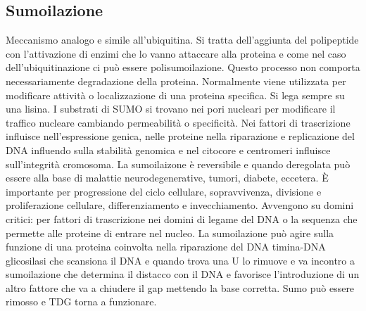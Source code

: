 \subsection{Sumoilazione}
Meccanismo analogo e simile all'ubiquitina. Si tratta dell'aggiunta del polipeptide con l'attivazione di enzimi che lo vanno attaccare alla proteina e come nel caso dell'ubiquitinazione
ci pu\`o essere polisumoilazione. Questo processo non comporta necessariamente degradazione della proteina. Normalmente viene utilizzata per modificare attivit\`a o localizzazione di una
proteina specifica. Si lega sempre su una lisina. I substrati di SUMO si trovano nei pori nucleari per modificare il traffico nucleare cambiando permeabilit\`a o specificit\`a. Nei 
fattori di trascrizione influisce nell'espressione genica, nelle proteine nella riparazione e replicazione del DNA influendo sulla stabilit\`a genomica e nel citocore e centromeri 
influisce sull'integrit\`a cromosoma. La sumoilaizone \`e reversibile e quando deregolata pu\`o essere alla base di malattie neurodegenerative, tumori, diabete, eccetera. \`E importante
per progressione del ciclo cellulare, sopravvivenza, divisione e proliferazione cellulare, differenziamento e invecchiamento. Avvengono su domini critici: per fattori di trascrizione
nei domini di legame del DNA o la sequenza che permette alle proteine di entrare nel nucleo. La sumoilazione pu\`o agire sulla funzione di una proteina coinvolta nella riparazione del
DNA timina-DNA glicosilasi che scansiona il DNA e quando trova una U lo rimuove e va incontro a sumoilazione che determina il distacco con il DNA e favorisce l'introduzione di un altro
fattore che va a chiudere il gap mettendo la base corretta. Sumo pu\`o essere rimosso e TDG torna a funzionare. 

